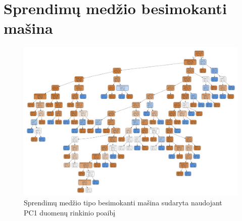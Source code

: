 \documentclass{VUMIFPSbakalaurinis}
\begin{document}
\appendix  %

\section{Sprendimų medžio besimokanti mašina}
\begin{figure}[H]
    \centering
    \includegraphics[scale=0.115, angle=90]{img/tree}
    \caption{Sprendimų medžio tipo besimokanti mašina sudaryta naudojant PC1 duomenų rinkinio poaibį}
    \label{img:tree}
\end{figure}
\end{document}
